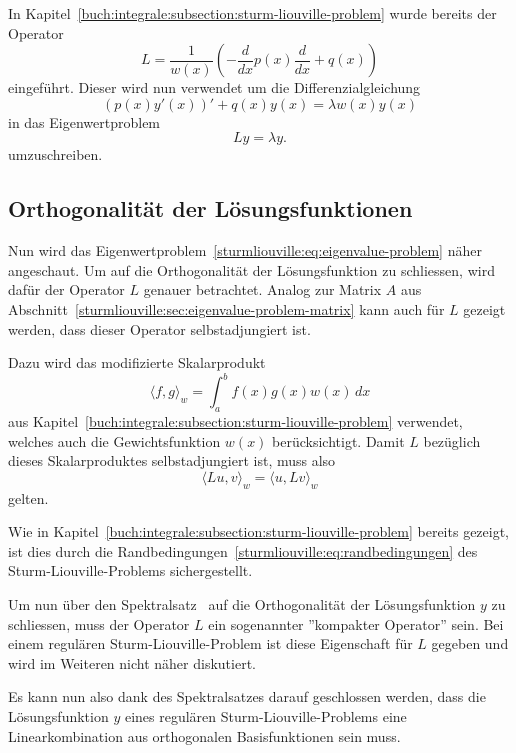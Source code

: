 In Kapitel~\ref{buch:integrale:subsection:sturm-liouville-problem} wurde bereits
der Operator
\[
    L
    =
    \frac{1}{w(x)}\left( -\frac{d}{dx}p(x) \frac{d}{dx} + q(x)\right)
\]
eingeführt.
Dieser wird nun verwendet um die Differenzialgleichung 
\[
    (p(x)y'(x))' + q(x)y(x)
    =
    \lambda w(x) y(x)
\]
in das Eigenwertproblem
%
\begin{equation}
    \label{sturmliouville:eq:eigenvalue-problem}
    L y
    =
    \lambda y.
\end{equation}
umzuschreiben.

\subsection{Orthogonalität der Lösungsfunktionen}

Nun wird das Eigenwertproblem~\eqref{sturmliouville:eq:eigenvalue-problem} näher
angeschaut.
Um auf die Orthogonalität der Lösungsfunktion zu schliessen, wird dafür der
Operator $L$ genauer betrachtet.
Analog zur Matrix $A$ aus 
Abschnitt~\ref{sturmliouville:sec:eigenvalue-problem-matrix} kann auch für
$L$ gezeigt werden, dass dieser Operator selbstadjungiert ist.

Dazu wird das modifizierte Skalarprodukt
\begin{equation}
    \label{sturmliouville:eq:modified-dot-product}
    \langle f, g \rangle_w
    =
    \int_a^b f(x)g(x)w(x)\,dx
\end{equation}
aus Kapitel~\ref{buch:integrale:subsection:sturm-liouville-problem} verwendet,
welches auch die Gewichtsfunktion $w(x)$ berücksichtigt.
Damit $L$ bezüglich dieses Skalarproduktes selbstadjungiert ist, muss also
\[
    \langle L u, v\rangle_w
    =
    \langle u, L v\rangle_w
\]
gelten.

Wie in Kapitel~\ref{buch:integrale:subsection:sturm-liouville-problem} bereits
gezeigt, ist dies durch die
Randbedingungen~\eqref{sturmliouville:eq:randbedingungen} des
Sturm-Liouville-Problems sichergestellt.

Um nun über den Spektralsatz~\cite{sturmliouville:spektralsatz-wiki} auf die
%
Orthogonalität der Lösungsfunktion $y$ zu schliessen, muss der Operator $L$ ein
sogenannter ''kompakter Operator'' sein.
Bei einem regulären Sturm-Liouville-Problem ist diese Eigenschaft für $L$
gegeben und wird im Weiteren nicht näher diskutiert.

Es kann nun also dank des Spektralsatzes darauf geschlossen werden, dass die
Lösungsfunktion $y$ eines regulären Sturm-Liouville-Problems eine
Linearkombination aus orthogonalen Basisfunktionen sein muss.

